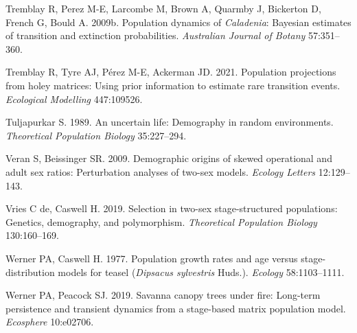 \documentclass[
  12pt,
  letterpaper,
]{book}
\newlength{\cslhangindent}
\newenvironment{CSLReferences}[2] %
 {\begin{list}{}{%
  \setlength{\itemindent}{0pt}
  \setlength{\leftmargin}{0pt}
  \setlength{\parsep}{0pt}
  \ifodd #1
   \setlength{\leftmargin}{\cslhangindent}
   \setlength{\itemindent}{-1\cslhangindent}
  \fi
  \setlength{\itemsep}{#2\baselineskip}}}
 {\end{list}}
\begin{document}
\begin{CSLReferences}{1}{0}
Tremblay R, Perez M-E, Larcombe M, Brown A, Quarmby J, Bickerton D,
French G, Bould A. 2009b. Population dynamics of \emph{{C}aladenia}:
Bayesian estimates of transition and extinction probabilities.
\emph{Australian Journal of Botany} 57:351--360.

Tremblay R, Tyre AJ, Pérez M-E, Ackerman JD. 2021. Population
projections from holey matrices: Using prior information to estimate
rare transition events. \emph{Ecological Modelling} 447:109526.

Tuljapurkar S. 1989. An uncertain life: Demography in random
environments. \emph{Theoretical Population Biology} 35:227--294.

Veran S, Beissinger SR. 2009. Demographic origins of skewed operational
and adult sex ratios: Perturbation analyses of two-sex models.
\emph{Ecology Letters} 12:129--143.

Vries C de, Caswell H. 2019. Selection in two-sex stage-structured
populations: Genetics, demography, and polymorphism. \emph{Theoretical
Population Biology} 130:160--169.

Werner PA, Caswell H. 1977. Population growth rates and age versus
stage-distribution models for teasel (\emph{{D}ipsacus {s}ylvestris}
{H}uds.). \emph{Ecology} 58:1103--1111.

Werner PA, Peacock SJ. 2019. Savanna canopy trees under fire: Long-term
persistence and transient dynamics from a stage-based matrix population
model. \emph{Ecosphere} 10:e02706.

\end{CSLReferences}


\backmatter
\end{document}
